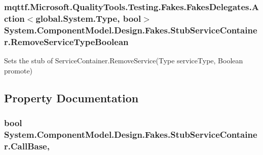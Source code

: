 \hypertarget{class_system_1_1_component_model_1_1_design_1_1_fakes_1_1_stub_service_container_ac5328075c0a35de89f0493518d899b9d}{
\subsubsection[{Remove\-Service\-Type\-Boolean}]{\setlength{\rightskip}{0pt plus 5cm}mqttf.\-Microsoft.\-Quality\-Tools.\-Testing.\-Fakes.\-Fakes\-Delegates.\-Action$<$global.\-System.\-Type, bool$>$ System.\-Component\-Model.\-Design.\-Fakes.\-Stub\-Service\-Container.\-Remove\-Service\-Type\-Boolean}}\label{class_system_1_1_component_model_1_1_design_1_1_fakes_1_1_stub_service_container_ac5328075c0a35de89f0493518d899b9d}


Sets the stub of Service\-Container.\-Remove\-Service(\-Type service\-Type, Boolean promote)



\subsection{Property Documentation}
\hypertarget{class_system_1_1_component_model_1_1_design_1_1_fakes_1_1_stub_service_container_ad72dd70cff6e0e92f69bea240561b390}{
\subsubsection[{Call\-Base}]{\setlength{\rightskip}{0pt plus 5cm}bool System.\-Component\-Model.\-Design.\-Fakes.\-Stub\-Service\-Container.\-Call\-Base\hspace{0.3cm}{\ttfamily [get]}, {\ttfamily [set]}}}\label{class_system_1_1_component_model_1_1_design_1_1_fakes_1_1_stub_service_container_ad72dd70cff6e0e92f69bea240561b390}



